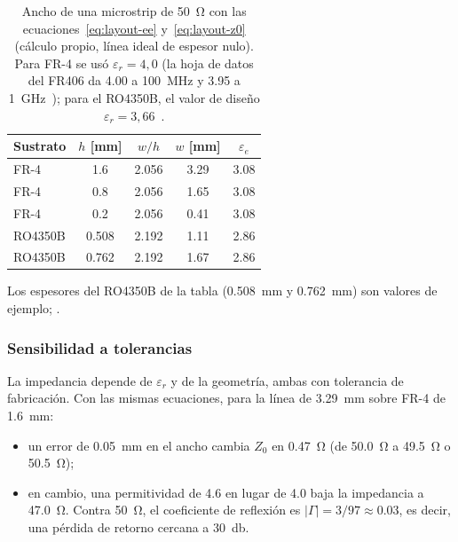 \begin{table}[H]
  \centering
  \caption[Ancho de microstrip de 50 ohm (cálculo propio).]{Ancho de una microstrip de \SI{50}{\ohm} con las ecuaciones~\eqref{eq:layout-ee} y~\eqref{eq:layout-z0} (cálculo propio, línea ideal de espesor nulo). Para FR-4 se usó $\varepsilon_r = 4{,}0$ (la hoja de datos del FR406 da \num{4,00} a \SI{100}{\mega\hertz} y \num{3,95} a \SI{1}{\giga\hertz}~\cite{isolafr406}); para el RO4350B, el valor de diseño $\varepsilon_r = 3{,}66$~\cite{rogersro4350b}.}\label{tab:layout-ms}
  \begin{tabular}{@{}lcccc@{}}
    \toprule
    Sustrato & $h$ [mm] & $w/h$ & $w$ [mm] & $\varepsilon_e$ \\
    \midrule
    FR-4     & \num{1,6}   & \num{2,056} & \num{3,29} & \num{3,08} \\
    FR-4     & \num{0,8}   & \num{2,056} & \num{1,65} & \num{3,08} \\
    FR-4     & \num{0,2}   & \num{2,056} & \num{0,41} & \num{3,08} \\
    RO4350B  & \num{0,508} & \num{2,192} & \num{1,11} & \num{2,86} \\
    RO4350B  & \num{0,762} & \num{2,192} & \num{1,67} & \num{2,86} \\
    \bottomrule
  \end{tabular}
\end{table}

Los espesores del RO4350B de la tabla (\SI{0,508}{\milli\metre} y \SI{0,762}{\milli\metre}) son valores de ejemplo; .

\subsubsection{Sensibilidad a tolerancias}

La impedancia depende de $\varepsilon_r$ y de la geometría, ambas con tolerancia de fabricación. Con las mismas ecuaciones, para la línea de \SI{3,29}{\milli\metre} sobre FR-4 de \SI{1,6}{\milli\metre}:

\begin{itemize}
  \item un error de \SI{0,05}{\milli\metre} en el ancho cambia $Z_0$ en \SI{0,47}{\ohm} (de \SI{50,0}{\ohm} a \SI{49,5}{\ohm} o \SI{50,5}{\ohm});
  \item en cambio, una permitividad de \num{4,6} en lugar de \num{4,0} baja la impedancia a \SI{47,0}{\ohm}. Contra \SI{50}{\ohm}, el coeficiente de reflexión es $|\Gamma| = 3/97 \approx \num{0,03}$, es decir, una pérdida de retorno cercana a \SI{30}{\decibel}.
\end{itemize}

